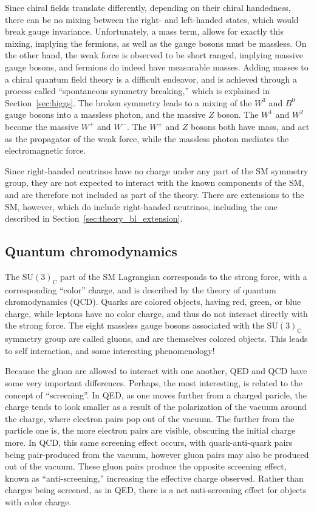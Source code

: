 Since chiral fields translate differently, depending on their chiral handedness,
there can be no mixing between the right- and left-handed states, which would
break gauge invariance.
Unfortunately, a mass term, allows for exactly this mixing, implying the
fermions, as well as the gauge bosons must be massless.
On the other hand, the weak force is observed to be short ranged, implying
massive gauge bosons, and fermions do indeed have measurable masses.
Adding masses to a chiral quantum field theory is a difficult endeavor, and
is achieved through a process called ``spontaneous symmetry breaking,'' which
is explained in Section~\ref{sec:higgs}.
The broken symmetry leads to a mixing of the $W^3$ and $B^0$ gauge bosons into
a massless photon, and the massive $Z$ boson.
The $W^1$ and $W^2$ become the massive $W^{+}$ and $W^{-}$.
The $W^{\pm}$ and $Z$ bosons both have mass, and act as the propagator of the
weak force, while the massless photon mediates the electromagnetic force.

Since right-handed neutrinos have no charge under any part of the SM symmetry
group, they are not expected to interact with the known components of the SM,
and are therefore not included as part of the theory.
There are extensions to the SM, however, which do include right-handed
neutrinos, including the one described in Section~\ref{sec:theory_bl_extension}.

\subsection{Quantum chromodynamics}
\label{sec:qcd}

The $\mathrm{SU}(3)_\mathrm{C}$ part of the SM Lagrangian corresponds to the
strong force, with a corresponding ``color'' charge, and is described by the
theory of quantum chromodynamics (QCD).
Quarks are colored objects, having red, green, or blue charge, while leptons
have no color charge, and thus do not interact directly with the strong
force.
The eight massless gauge bosons associated with the
$\mathrm{SU}(3)_\mathrm{C}$ symmetry group are called gluons, and are
themselves colored objects.
This leads to self interaction, and some interesting phenomenology!

Because the gluon are allowed to interact with one another, QED and QCD have
some very important differences.
Perhaps, the most interesting, is related to the concept of ``screening''.
In QED, as one moves further from a charged paricle, the charge tends to look
smaller as a result of the polarization of the vacuum around the charge, where
electron pairs pop out of the vacuum.
The further from the particle one is, the more electron pairs are visible,
obscuring the initial charge more.
In QCD, this same screening effect occurs, with quark-anti-quark pairs being
pair-produced from the vacuum, however gluon pairs may also be produced out of
the vacuum.
These gluon pairs produce the opposite screening effect, known as
``anti-screening,'' increasing the effective charge observed.
Rather than charges being screened, as in QED, there is a net anti-screening
effect for objects with color charge.

